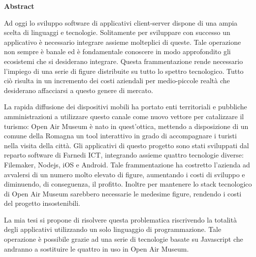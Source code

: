 \thispagestyle{empty}

\begin{flushleft}
	
  {\bf \Huge Abstract}

\vspace{4cm}

Ad oggi lo sviluppo software di applicativi client-server dispone di una ampia scelta di linguaggi e tecnologie. Solitamente per sviluppare con successo un applicativo è necessario integrare assieme molteplici di queste. Tale operazione non sempre è banale ed è fondamentale conoscere in modo approfondito gli ecosistemi che si desiderano integrare. Questa frammentazione rende necessario l'impiego di una serie di figure distribuite su tutto lo spettro tecnologico. Tutto ciò risulta in un incremento dei costi aziendali per medio-piccole realtà che desiderano affacciarsi a questo genere di mercato.\vspace{5mm}

La rapida diffusione dei dispositivi mobili ha portato enti territoriali e pubbliche amministrazioni a utilizzare questo canale come nuovo vettore per catalizzare il turismo: Open Air Museum è nato in quest'ottica, mettendo a disposizione di un comune della Romagna un tool interattivo in grado di accompagnare i turisti nella visita della città. Gli applicativi di questo progetto sono stati sviluppati dal reparto software di Farnedi ICT, integrando assieme quattro tecnologie diverse: Filemaker, Nodejs, iOS e Android. Tale frammentazione ha costretto l'azienda ad avvalersi di un numero molto elevato di figure, aumentando i costi di sviluppo e diminuendo, di conseguenza, il profitto. Inoltre per mantenere lo stack tecnologico di Open Air Museum sarebbero necessarie le medesime figure, rendendo i costi del progetto insostenibili.\vspace{5mm}

La mia tesi si propone di risolvere questa problematica riscrivendo la totalità degli applicativi utilizzando un solo linguaggio di programmazione. Tale operazione è possibile grazie ad una serie di tecnologie basate su Javascript che andranno a sostituire le quattro in uso in Open Air Museum.

\end{flushleft}